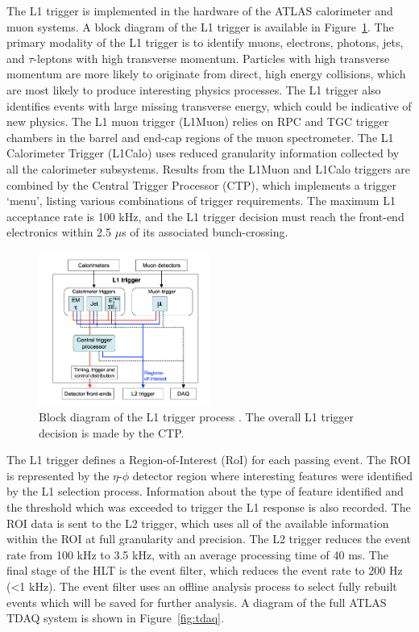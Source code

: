 	The L1 trigger is implemented in the hardware of the ATLAS calorimeter and muon systems. A block diagram of the L1 trigger is available in Figure~\ref{fig:l1_trigger}. The primary modality of the L1 trigger is to identify muons, electrons, photons, jets, and $\tau$-leptons with high transverse momentum. Particles with high transverse momentum are more likely to originate from direct, high energy collisions, which are most likely to produce interesting physics processes. The L1 trigger also identifies events with large missing transverse energy, which could be indicative of new physics. The L1 muon trigger (L1Muon) relies on RPC and TGC trigger chambers in the barrel and end-cap regions of the muon spectrometer. The L1 Calorimeter Trigger (L1Calo) uses reduced granularity information collected by all the calorimeter subsystems. Results from the L1Muon and L1Calo triggers are combined by the Central Trigger Processor (CTP), which implements a trigger `menu', listing various combinations of trigger requirements. The maximum L1 acceptance rate is 100 kHz, and the L1 trigger decision must reach the front-end electronics within 2.5 $\mu$s of its associated bunch-crossing.\par

\begin{figure}
        \centering
	\includegraphics[width=0.5\textwidth]{figures/ch4/l1_trigger}
	\caption{Block diagram of the L1 trigger process  \cite{atlas_overview}. The overall L1 trigger decision is made by the CTP.  }
	\label{fig:l1_trigger}
\end{figure}
	
	The L1 trigger defines a Region-of-Interest (RoI) for each passing event. The ROI is represented by the $\eta$-$\phi$ detector region where interesting features were identified by the L1 selection process. Information about the type of feature identified and the threshold which was exceeded to trigger the L1 response is also recorded. The ROI data is sent to the L2 trigger, which uses all of the available information within the ROI at full granularity and precision. The L2 trigger reduces the event rate from 100 kHz to 3.5 kHz, with an average processing time of 40 ms. The final stage of the HLT is the event filter, which reduces the event rate to 200 Hz (<1 kHz). The event filter uses an offline analysis process to select fully rebuilt events which will be saved for further analysis. A diagram of the full ATLAS TDAQ system is shown in Figure~\ref{fig:tdaq}.\par
	
